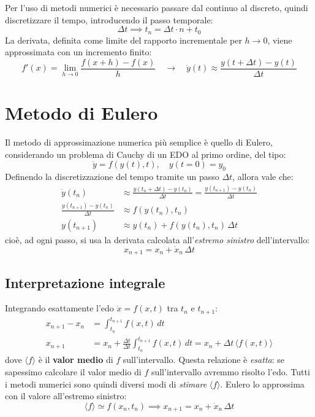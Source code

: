 \documentclass[11pt, a4paper, openright]{book}
\theoremstyle{plain}
\theoremstyle{definition}
\theoremstyle{remark}
\begin{document}
Per l'uso di metodi numerici è necessario passare dal continuo al discreto, quindi discretizzare il tempo, introducendo il passo temporale:
\begin{equation}
    \Delta t \implies t_n = \Delta t \cdot n + t_0
\end{equation}
La derivata, definita come limite del rapporto incrementale per $h \to 0$, viene approssimata con un incremento finito:
\begin{equation}
    f'(x) = \lim_{h \to 0}\frac{f(x + h) - f(x)}{h} \quad\longrightarrow\quad \dot{y}(t) \approx \frac{y(t + \Delta t) - y(t)}{\Delta t}
\end{equation}

\section{Metodo di Eulero}
Il metodo di approssimazione numerica più semplice è quello di Eulero, considerando un problema di Cauchy di un EDO al primo ordine, del tipo:
\begin{equation}
    \dot{y} = f(y(t), t), \quad y(t = 0) = y_0
\end{equation}
Definendo la discretizzazione del tempo tramite un passo $\Delta t$, allora vale che:
\begin{align}
    \dot{y}(t_n) & \approx \frac{y(t_n + \Delta t) - y(t_n)}{\Delta t} = \frac{y(t_{n + 1}) - y(t_n)}{\Delta t} \\
    \frac{y(t_{n + 1}) - y(t_n)}{\Delta t} & \approx f(y(t_n), t_n) \\
    y(t_{n + 1}) & \approx y(t_n) + f(y(t_n), t_n)\,\Delta t
\end{align}
cioè, ad ogni passo, si usa la derivata calcolata all'\emph{estremo sinistro} dell'intervallo:
\begin{equation}
    \boxed{x_{n + 1} = x_n + \dot{x}_n\,\Delta t}
\end{equation}

\subsection{Interpretazione integrale}
Integrando esattamente l'edo $\dot{x} = f(x, t)$ tra $t_n$ e $t_{n + 1}$:
\begin{align}
    x_{n + 1} - x_n &= \int_{t_n}^{t_{n + 1}} f(x, t)\,dt \\
    x_{n + 1} &= x_n + \frac{\Delta t}{\Delta t}\int_{t_n}^{t_{n + 1}} f(x, t)\,dt = x_n + \Delta t\,\langle f(x, t)\rangle
\end{align}
dove $\langle f\rangle$ è il \textbf{valor medio} di $f$ sull'intervallo. Questa relazione è \emph{esatta}: se sapessimo calcolare il valor medio di $f$ sull'intervallo avremmo risolto l'edo. Tutti i metodi numerici sono quindi diversi modi di \emph{stimare} $\langle f\rangle$. Eulero lo approssima con il valore all'estremo sinistro:
\begin{equation}
    \langle f\rangle \simeq f(x_n, t_n) \implies x_{n + 1} = x_n + \dot{x}_n\,\Delta t
\end{equation}
\end{document}

